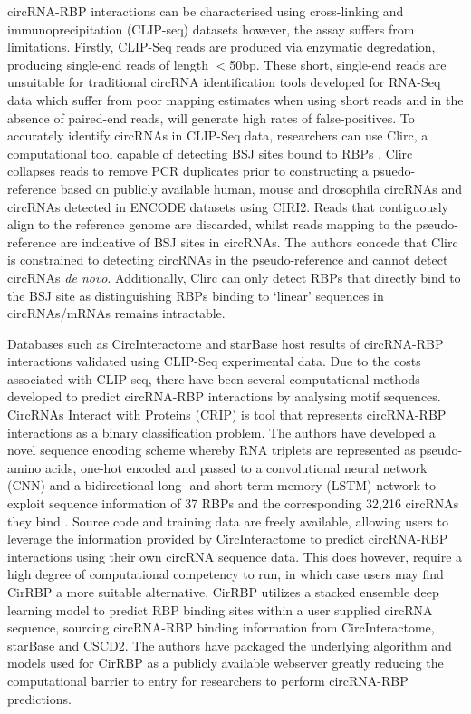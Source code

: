 circRNA-RBP interactions can be characterised using cross-linking and immunoprecipitation (CLIP-seq) datasets however, the assay suffers from limitations. Firstly, CLIP-Seq reads are produced via enzymatic degredation, producing single-end reads of length $<$50bp. These short, single-end reads are unsuitable for traditional circRNA identification tools developed for RNA-Seq data which suffer from poor mapping estimates when using short reads and in the absence of paired-end reads, will generate high rates of false-positives. To accurately identify circRNAs in CLIP-Seq data, researchers can use Clirc, a computational tool capable of detecting BSJ sites bound to RBPs \cite{Clirc}. Clirc collapses reads to remove PCR duplicates prior to constructing a psuedo-reference based on publicly available human, mouse and drosophila circRNAs and circRNAs detected in ENCODE datasets using CIRI2. Reads that contiguously align to the reference genome are discarded, whilst reads mapping to the pseudo-reference are indicative of BSJ sites in circRNAs. The authors concede that Clirc is constrained to detecting circRNAs in the pseudo-reference and cannot detect circRNAs \textit{de novo}. Additionally, Clirc can only detect RBPs that directly bind to the BSJ site as distinguishing RBPs binding to `linear' sequences in circRNAs/mRNAs remains intractable. \par
Databases such as CircInteractome \cite{circinteractome} and starBase \cite{starbase} host results of circRNA-RBP interactions validated using CLIP-Seq experimental data. Due to the costs associated with CLIP-seq, there have been several computational methods developed to predict circRNA-RBP interactions by analysing motif sequences. CircRNAs Interact with Proteins (CRIP) is tool that represents circRNA-RBP interactions as a binary classification problem. The authors have developed a novel sequence encoding scheme whereby RNA triplets are represented as pseudo-amino acids, one-hot encoded and passed to a convolutional neural network (CNN) and a bidirectional long- and short-term memory (LSTM) network to exploit sequence information of 37 RBPs and the corresponding 32,216 circRNAs they bind \cite{CRIP}. Source code and training data are freely available, allowing users to leverage the information provided by CircInteractome to predict circRNA-RBP interactions using their own circRNA sequence data. This does however, require a high degree of computational competency to run, in which case users may find CirRBP \cite{CirRBP} a more suitable alternative. CirRBP utilizes a stacked ensemble deep learning model to predict RBP binding sites within a user supplied circRNA sequence, sourcing circRNA-RBP binding information from CircInteractome, starBase and CSCD2. The authors have packaged the underlying algorithm and models used for CirRBP as a publicly available webserver \cite{cirRBP-website} greatly reducing the computational barrier to entry for researchers to perform circRNA-RBP predictions. 


